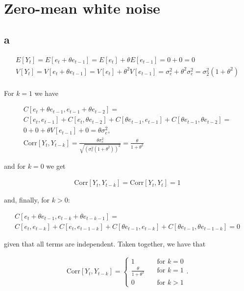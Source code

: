 \documentclass[]{book}
\begin{document}
\section{Zero-mean white noise}\label{zero-mean-white-noise}

\subsection*{a}\label{a-2}

\begin{gather*}
  E[Y_t] = E[e_t+\theta e_{t-1}] = E[e_t] + \theta E[e_{t-1}] = 0 + 0 = 0\\
  V[Y_t] = V[e_t + \theta e_{t-1}] =  V[e_t] + \theta^2 V[e_{t-1}] = \sigma_e^2 + \theta^2 \sigma_e^2 = \sigma_2^2(1 + \theta^2)\\
\end{gather*}

For \(k = 1\) we have

\begin{gather*}
  C[e_t + \theta e_{t-1}, e_{t-1} + \theta e_{t-2}] = \\
  C[e_t,e_{t-1}] + C[e_t, \theta e_{t-2}] + C[\theta e_{t-1}, e_{t-1}] + C[\theta e_{t-1}, \theta e_{t-2}] = \\
  0 + 0 + \theta V[e_{t-1}] + 0 = \theta \sigma_e^2,\\
  \text{Corr}[Y_t, Y_{t-k}] = \frac{\theta \sigma_e^2}{\sqrt{(\sigma_e^2(1+\theta^2))^2}} = \frac{\theta }{1+\theta^2}
\end{gather*}

and for \(k = 0\) we get

\begin{gather*}
  \text{Corr}[Y_t, Y_{t-k}] = \text{Corr}[Y_t, Y_t] = 1
\end{gather*}

and, finally, for \(k > 0\):

\begin{gather*}
  C[e_t + \theta e_{t-1}, e_{t-k} + \theta e_{t-k-1}] = \\
  C[e_t, e_{t-k}] + C[e_t, e_{t-1-k}] + C[\theta e_{t-1}, e_{t-k}] + C[\theta e_{t-1}, \theta e_{t-1-k}] = 0
\end{gather*}

given that all terms are independent. Taken together, we have that

\begin{gather*} \text{Corr}[Y_t, Y_{t-k}] =
  \begin{cases}
    1                            & \quad \text{for } k = 0\\
    \frac{\theta}{1 + \theta^2}  & \quad \text{for } k = 1\\
    0                            & \quad \text{for } k > 1
  \end{cases}.
\end{gather*}
\end{document}
